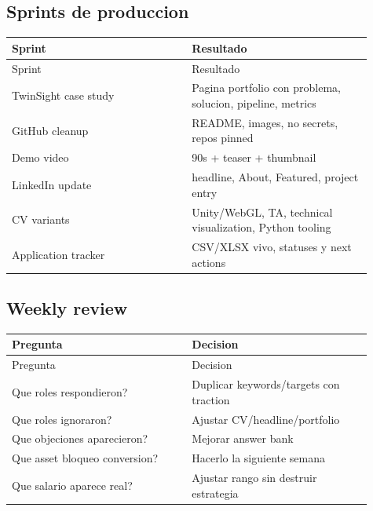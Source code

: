 \subsection{Sprints de produccion}


\begin{center}
\scriptsize
\begin{longtable}{>{\raggedright\arraybackslash}p{0.455\linewidth} >{\raggedright\arraybackslash}p{0.455\linewidth}}
\toprule
Sprint & Resultado \\
\midrule
\endfirsthead
\toprule
Sprint & Resultado \\
\midrule
\endhead
TwinSight case study & Pagina portfolio con problema, solucion, pipeline, metrics \\
GitHub cleanup & README, images, no secrets, repos pinned \\
Demo video & 90s + teaser + thumbnail \\
LinkedIn update & headline, About, Featured, project entry \\
CV variants & Unity/WebGL, TA, technical visualization, Python tooling \\
Application tracker & CSV/XLSX vivo, statuses y next actions \\
\bottomrule
\end{longtable}
\end{center}


\subsection{Weekly review}


\begin{center}
\scriptsize
\begin{longtable}{>{\raggedright\arraybackslash}p{0.455\linewidth} >{\raggedright\arraybackslash}p{0.455\linewidth}}
\toprule
Pregunta & Decision \\
\midrule
\endfirsthead
\toprule
Pregunta & Decision \\
\midrule
\endhead
Que roles respondieron? & Duplicar keywords/targets con traction \\
Que roles ignoraron? & Ajustar CV/headline/portfolio \\
Que objeciones aparecieron? & Mejorar answer bank \\
Que asset bloqueo conversion? & Hacerlo la siguiente semana \\
Que salario aparece real? & Ajustar rango sin destruir estrategia \\
\bottomrule
\end{longtable}
\end{center}


